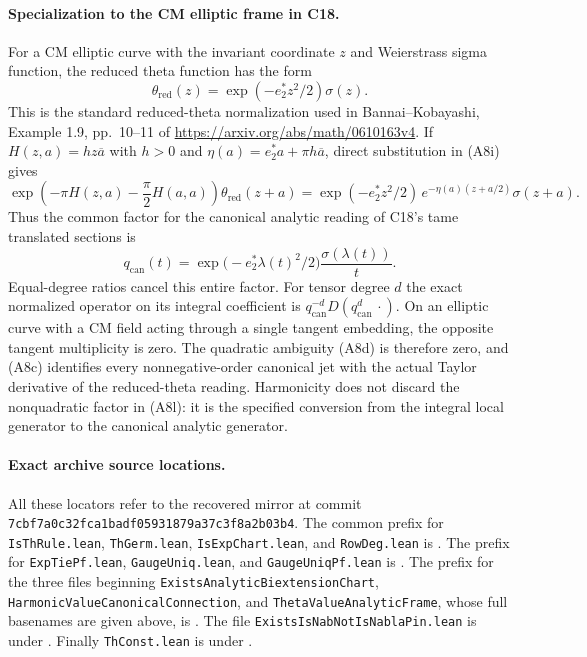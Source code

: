 \documentclass[11pt]{article}
\theoremstyle{definition}\newtheorem{definition}[theorem]{Definition}\newtheorem{remark}[theorem]{Remark}
\begin{document}
\paragraph{Specialization to the CM elliptic frame in C18.}
For a CM elliptic curve with the invariant coordinate $z$ and
Weierstrass sigma function, the reduced theta function has the
form
\[
 \theta_{\mathrm{red}}(z)
       =\exp(-e_2^*z^2/2)\sigma(z).
 \tag{A8j}
\]
This is the standard reduced-theta normalization used in
Bannai--Kobayashi, Example 1.9, pp.~10--11 of
\url{https://arxiv.org/abs/math/0610163v4}.
If $H(z,a)=h z\overline a$ with $h>0$ and
$\eta(a)=e_2^*a+\pi h\overline a$, direct substitution in (A8i)
gives
\[
 \exp\left(-\pi H(z,a)-\frac\pi2H(a,a)\right)
          \theta_{\mathrm{red}}(z+a)
       =\exp(-e_2^*z^2/2)\,
             e^{-\eta(a)(z+a/2)}\sigma(z+a).
 \tag{A8k}
\]
Thus the common factor for the canonical analytic reading of
C18's tame translated sections is
\[
      q_{\mathrm{can}}(t)
       =\exp\bigl(-e_2^*\lambda(t)^2/2\bigr)
                         \frac{\sigma(\lambda(t))}{t}.
 \tag{A8l}
\]
Equal-degree ratios cancel this entire factor.  For tensor degree
$d$ the exact normalized operator on its integral coefficient is
$q_{\mathrm{can}}^{-d}D(q_{\mathrm{can}}^d\,\cdot)$.
On an elliptic curve with a CM field acting through a single
tangent embedding, the opposite tangent multiplicity is zero.
The quadratic ambiguity (A8d) is therefore zero, and (A8c)
identifies every nonnegative-order canonical jet with the actual
Taylor derivative of the reduced-theta reading.  Harmonicity
does not discard the nonquadratic factor in (A8l): it is the
specified conversion from the integral local generator to the
canonical analytic generator.

\paragraph{Exact archive source locations.}
All these locators refer to the recovered mirror at commit
\nolinkurl{7cbf7a0c32fca1badf05931879a37c3f8a2b03b4}.
The common prefix for \texttt{IsThRule.lean},
\texttt{ThGerm.lean}, \texttt{IsExpChart.lean}, and
\texttt{RowDeg.lean} is
.
The prefix for \texttt{ExpTiePf.lean},
\texttt{GaugeUniq.lean}, and \texttt{GaugeUniqPf.lean} is
.
The prefix for the three files beginning
\nolinkurl{ExistsAnalyticBiextensionChart},
\nolinkurl{HarmonicValueCanonicalConnection}, and
\nolinkurl{ThetaValueAnalyticFrame}, whose full basenames are given
above, is
.
The file \nolinkurl{ExistsIsNabNotIsNablaPin.lean} is under
.
Finally \texttt{ThConst.lean} is under
.
\end{document}
